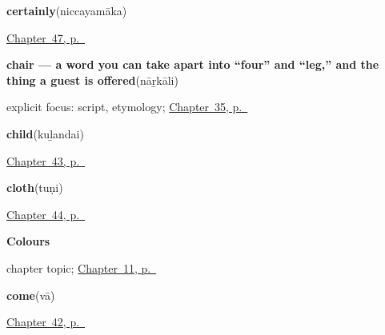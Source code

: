 \noindent\begin{minipage}[t]{\linewidth}
\raggedright
\textbf{certainly}\enspace\emph{}\enspace(niccayamāka)\par
\footnotesize \hyperref[ch:ta-replies]{Chapter~47, p.~\pageref*{ch:ta-replies}}
\end{minipage}\par\smallskip

\noindent\begin{minipage}[t]{\linewidth}
\raggedright
\textbf{chair — a word you can take apart into \textquotedblleft{}four\textquotedblright{} and \textquotedblleft{}leg,\textquotedblright{} and the thing a guest is offered}\enspace\emph{}\enspace(nāṟkāli)\par
\footnotesize explicit focus: script, etymology; \hyperref[ch:ta-arriving-at-a-house]{Chapter~35, p.~\pageref*{ch:ta-arriving-at-a-house}}
\end{minipage}\par\smallskip

\noindent\begin{minipage}[t]{\linewidth}
\raggedright
\textbf{child}\enspace\emph{}\enspace(kuḻandai)\par
\footnotesize \hyperref[ch:ta-household]{Chapter~43, p.~\pageref*{ch:ta-household}}
\end{minipage}\par\smallskip

\noindent\begin{minipage}[t]{\linewidth}
\raggedright
\textbf{cloth}\enspace\emph{}\enspace(tuṇi)\par
\footnotesize \hyperref[ch:ta-things-you-ask-for]{Chapter~44, p.~\pageref*{ch:ta-things-you-ask-for}}
\end{minipage}\par\smallskip

\noindent\begin{minipage}[t]{\linewidth}
\raggedright
\textbf{Colours}\par
\footnotesize chapter topic; \hyperref[ch:ta-colours]{Chapter~11, p.~\pageref*{ch:ta-colours}}
\end{minipage}\par\smallskip

\noindent\begin{minipage}[t]{\linewidth}
\raggedright
\textbf{come}\enspace\emph{}\enspace(vā)\par
\footnotesize \hyperref[ch:ta-more-verbs]{Chapter~42, p.~\pageref*{ch:ta-more-verbs}}
\end{minipage}\par\smallskip

